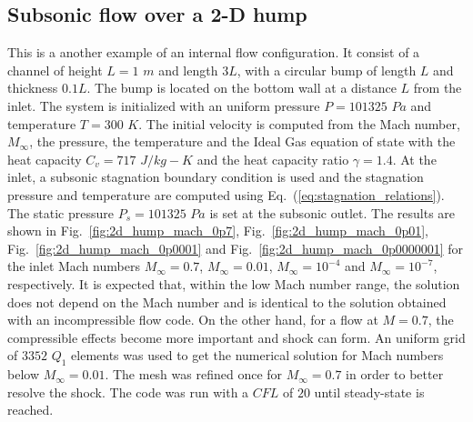 \documentclass[preprint,10pt]{elsarticle}
\newcommand{\eqt}[1]{Eq.~(\ref{#1})}                     %
\newcommand{\fig}[1]{Fig.~\ref{#1}}                      %
\begin{document}
\subsection{Subsonic flow over a 2-D hump} \label{sec:hump}

This is a another example of an internal flow configuration. It consist of a channel of height $L=1$ $m$ and length $3L$, with a circular bump of length $L$ and thickness $0.1L$. The bump is located on the bottom wall at a distance $L$ from the inlet. The system is initialized with an uniform pressure $P=101325$ $Pa$ and temperature $T=300$ $K$. The initial velocity is computed from the Mach number, $M_{\infty}$, the pressure, the temperature and the Ideal Gas equation of state with the heat capacity $C_v = 717$ $J/kg-K$ and the heat capacity ratio $\gamma=1.4$. At the inlet, a subsonic stagnation boundary condition is used and the stagnation pressure and temperature are computed using \eqt{eq:stagnation_relations}.
The static pressure $P_s = 101325$ $Pa$ is set at the subsonic outlet. The results are shown in \fig{fig:2d_hump_mach_0p7}, \fig{fig:2d_hump_mach_0p01}, \fig{fig:2d_hump_mach_0p0001} and \fig{fig:2d_hump_mach_0p0000001} for the inlet Mach numbers $M_{\infty}=0.7$, $M_{\infty}=0.01$, $M_{\infty}=10^{-4}$ and $M_{\infty}=10^{-7}$, respectively. It is expected that, within the low Mach number range, the solution does not depend on the Mach number and is identical to the solution obtained with an incompressible flow code. On the other hand, for a flow at $M=0.7$, the compressible effects become more important and shock can form. An uniform grid of $3352$ $Q_1$ elements was used to get the numerical solution for Mach numbers below $M_{\infty}=0.01$. The mesh was refined once for $M_{\infty}=0.7$ in order to better resolve the shock. The code was run with a $CFL$ of $20$ until steady-state is reached.
%
\end{document}
